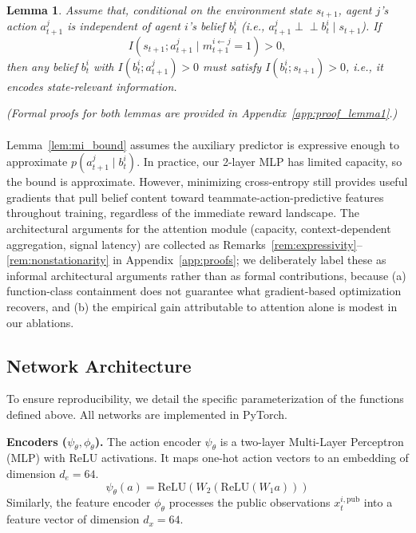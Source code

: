 \documentclass{article}
\theoremstyle{plain}
\newtheorem{lemma}[theorem]{Lemma}
\theoremstyle{definition}
\theoremstyle{remark}
\begin{document}
\begin{lemma}
\label{lem:state_relevance}
Assume that, conditional on the environment state $s_{t+1}$, agent $j$'s action $a_{t+1}^j$ is independent of agent $i$'s belief $b_t^i$ (i.e., $a_{t+1}^j \perp\!\!\!\perp b_t^i \mid s_{t+1}$). If
\begin{equation}
  I\!\left( s_{t+1} ; a_{t+1}^j \mid m_{t+1}^{i \leftarrow j} = 1 \right) > 0,
\end{equation}
then any belief $b_t^i$ with $I(b_t^i; a_{t+1}^j) > 0$ must satisfy $I(b_t^i; s_{t+1}) > 0$, i.e., it encodes state-relevant information.
\end{lemma}

\textit{(Formal proofs for both lemmas are provided in Appendix~\ref{app:proof_lemma1}.)}

\paragraph{}
Lemma~\ref{lem:mi_bound} assumes the auxiliary predictor is expressive enough to approximate $p(a_{t+1}^j \mid b_t^i)$. In practice, our 2-layer MLP has limited capacity, so the bound is approximate. However, minimizing cross-entropy still provides useful gradients that pull belief content toward teammate-action-predictive features throughout training, regardless of the immediate reward landscape. The architectural arguments for the attention module (capacity, context-dependent aggregation, signal latency) are collected as Remarks~\ref{rem:expressivity}--\ref{rem:nonstationarity} in Appendix~\ref{app:proofs}; we deliberately label these as informal architectural arguments rather than as formal contributions, because (a) function-class containment does not guarantee what gradient-based optimization recovers, and (b) the empirical gain attributable to attention alone is modest in our ablations.

\subsection{Network Architecture}
\label{sec:architecture}

To ensure reproducibility, we detail the specific parameterization of the functions defined above. All networks are implemented in PyTorch.

\textbf{Encoders ($\psi_\theta, \phi_\theta$).}
The action encoder $\psi_\theta$ is a two-layer Multi-Layer Perceptron (MLP) with ReLU activations. It maps one-hot action vectors to an embedding of dimension $d_e = 64$.
\[ \psi_\theta(a) = \mathrm{ReLU}(W_2 (\mathrm{ReLU}(W_1 a))) \]
Similarly, the feature encoder $\phi_\theta$ processes the public observations $x_t^{i,\mathrm{pub}}$ into a feature vector of dimension $d_x = 64$.
\end{document}
